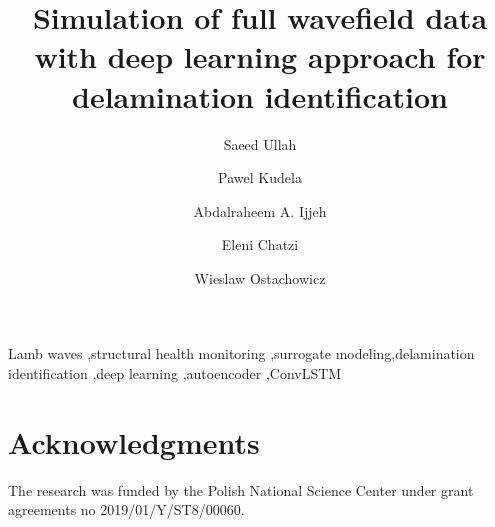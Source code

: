 \documentclass[preprint,9pt]{elsarticle}
\begin{document}
	\begin{frontmatter}
		\title{Simulation of full wavefield data with deep learning approach for delamination identification}
		
		\address[IFFM]{Institute of Fluid Flow Machinery, Polish Academy of 
		Sciences, Poland}
		\address[ETH]{Department of Civil, Environmental, and Geomatic Engineering, ETH Z\"{u}rich, Switzerland}
		\author{Saeed Ullah}
		\author{Pawel Kudela}
		\author{Abdalraheem A. Ijjeh}
		\author{Eleni Chatzi }
		\author{Wieslaw Ostachowicz }	
		
		\begin{abstract}
			
		\end{abstract}
		
		\begin{keyword}
			Lamb waves \sep structural health monitoring \sep surrogate 
			modeling\sep delamination identification \sep deep learning 
			\sep  autoencoder \sep ConvLSTM 
			
			
		\end{keyword}
	\end{frontmatter}
	
	
	
	
	
	\clearpage
	
	
	\clearpage	
	\section*{Acknowledgments}
	The research was funded by the Polish National Science Center under grant agreements no 2019/01/Y/ST8/00060.
	
	
\end{document}
